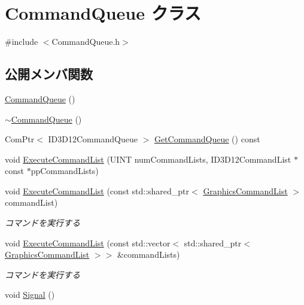 \hypertarget{class_command_queue}{}\section{Command\+Queue クラス}
\label{class_command_queue}


{\ttfamily \#include $<$Command\+Queue.\+h$>$}

\subsection*{公開メンバ関数}
\begin{DoxyCompactItemize}
\item 
\mbox{\hyperlink{class_command_queue_a80d86eb1a3b1dd57ea84bde88fd295ee}{Command\+Queue}} ()
\item 
\mbox{\hyperlink{class_command_queue_a4575d426ec483ab4778da0650c0556bb}{$\sim$\+Command\+Queue}} ()
\item 
Com\+Ptr$<$ I\+D3\+D12\+Command\+Queue $>$ \mbox{\hyperlink{class_command_queue_a17963d2efd7d03c7310e606246994c23}{Get\+Command\+Queue}} () const
\item 
void \mbox{\hyperlink{class_command_queue_ad6fd0cec1c28bd609a98a9f4255c57d7}{Execute\+Command\+List}} (U\+I\+NT num\+Command\+Lists, I\+D3\+D12\+Command\+List $\ast$const $\ast$pp\+Command\+Lists)
\item 
void \mbox{\hyperlink{class_command_queue_ae6d6d762d71e0ac15ea0d06f2d90f104}{Execute\+Command\+List}} (const std\+::shared\+\_\+ptr$<$ \mbox{\hyperlink{class_graphics_command_list}{Graphics\+Command\+List}} $>$ command\+List)
\begin{DoxyCompactList}\small\item\em コマンドを実行する \end{DoxyCompactList}\item 
void \mbox{\hyperlink{class_command_queue_a4eb09588cdee46fb51ab930b37dde17a}{Execute\+Command\+List}} (const std\+::vector$<$ std\+::shared\+\_\+ptr$<$ \mbox{\hyperlink{class_graphics_command_list}{Graphics\+Command\+List}} $>$$>$ \&command\+Lists)
\begin{DoxyCompactList}\small\item\em コマンドを実行する \end{DoxyCompactList}\item 
void \mbox{\hyperlink{class_command_queue_a9c6cf1b8ebba43239e9a1119e942294a}{Signal}} ()
\end{DoxyCompactItemize}
